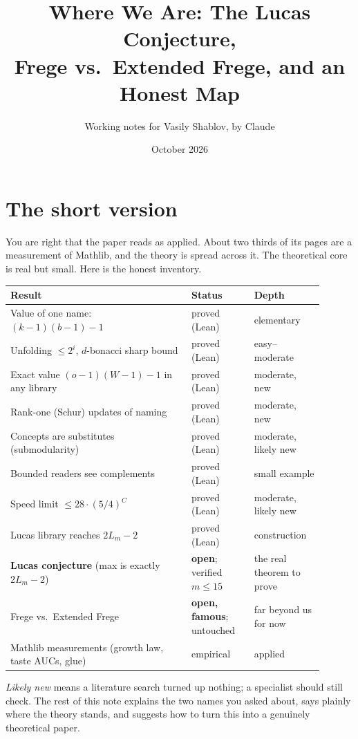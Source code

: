 \documentclass[11pt]{article}
\title{Where We Are: The Lucas Conjecture,\\ Frege vs.\ Extended Frege, and an Honest Map}
\author{Working notes for Vasily Shablov, by Claude}
\date{October 2026}
\begin{document}
\maketitle

\section{The short version}

You are right that the paper reads as applied. About two thirds of its pages are a
measurement of Mathlib, and the theory is spread across it. The theoretical core is real
but small. Here is the honest inventory.

\begin{center}\small
\begin{tabular}{p{0.52\linewidth}p{0.18\linewidth}p{0.2\linewidth}}
\toprule
Result & Status & Depth \\
\midrule
Value of one name: $(k-1)(b-1)-1$ & proved (Lean) & elementary \\
Unfolding $\le 2^i$, $d$-bonacci sharp bound & proved (Lean) & easy--moderate \\
Exact value $(o-1)(W-1)-1$ in any library & proved (Lean) & moderate, new \\
Rank-one (Schur) updates of naming & proved (Lean) & moderate, new \\
Concepts are substitutes (submodularity) & proved (Lean) & moderate, likely new \\
Bounded readers see complements & proved (Lean) & small example \\
Speed limit $\le 28\cdot(5/4)^C$ & proved (Lean) & moderate, likely new \\
Lucas library reaches $2L_m-2$ & proved (Lean) & construction \\
\textbf{Lucas conjecture} (max is exactly $2L_m-2$) & \textbf{open}; verified $m\le15$ & the real theorem to prove \\
Frege vs.\ Extended Frege & \textbf{open, famous}; untouched & far beyond us for now \\
Mathlib measurements (growth law, taste AUCs, glue) & empirical & applied \\
\bottomrule
\end{tabular}
\end{center}

\noindent \emph{Likely new} means a literature search turned up nothing; a specialist
should still check. The rest of this note explains the two names you asked about, says
plainly where the theory stands, and suggests how to turn this into a genuinely
theoretical paper.
\end{document}

